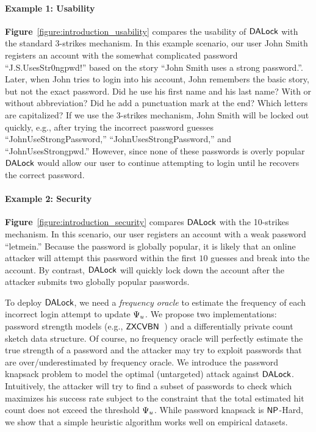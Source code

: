 \paragraph{Example 1: Usability} \textbf{Figure}~\ref{figure:introduction_usability} compares the usability of $\mathsf{DALock}$ with the standard 3-strikes mechanism. In this example scenario, our user John Smith registers an account with the somewhat complicated password ``J.S.UsesStr0ngpwd!'' based on the story ``John Smith uses a strong password.''. Later, when John tries to login into his account, John remembers the basic story, but not the exact password. Did he use his first name and his last name? With or without abbreviation? Did he add a punctuation mark at the end? Which letters are capitalized? If we use the 3-strikes mechanism, John Smith will be locked out quickly, e.g., after trying the incorrect password guesses ``JohnUseStrongPassword,'' ``JohnUsesStrongPassword,'' and ``JohnUsesStrongpwd.'' However, since none of these passwords is overly popular $\mathsf{DALock}$ would allow our user to continue attempting to login until he recovers the correct password. 



\paragraph{Example 2: Security} \textbf{Figure}~\ref{figure:introduction_security} compares $\mathsf{DALock}$ with the 10-strikes mechanism. In this scenario, our user registers an account with a weak password ``letmein.'' Because the password is globally popular, it is likely that an online attacker will attempt this password within the first $10$ guesses and break into the account. By contrast, $\mathsf{DALock}$ will quickly lock down the account after the attacker submits two globally popular passwords. 


To deploy $\mathsf{DALock}$, we need a \textit{frequency oracle} to estimate the frequency of each incorrect login attempt to update $\Psi_{u}$. We propose two implementations: password strength models (e.g., $\mathsf{ZXCVBN}$~\cite{USENIX:Wheeler16}) and a differentially private count sketch data structure. Of course, no frequency oracle will perfectly estimate the true strength of a password and the attacker may try to exploit passwords that are over/underestimated by frequency oracle. We introduce the password knapsack problem to model the optimal (untargeted) attack against $\mathsf{DALock}$. Intuitively, the attacker will try to find a subset of passwords to check which maximizes his success rate subject to the constraint that the total estimated hit count does not exceed the threshold $\Psi_{u}$.  While password knapsack is $\mathsf{NP}$-Hard, we show that a simple heuristic algorithm works well on empirical datasets. 


